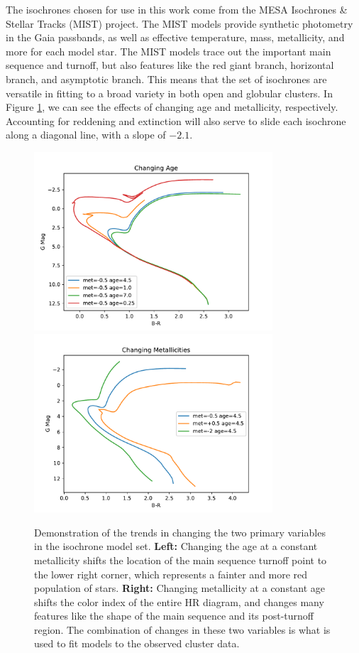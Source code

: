 \documentclass[onecolumn,table,xcdraw,super]{aastex631}
\begin{document}
The isochrones chosen for use in this work come from the MESA Isochrones \& Stellar Tracks (MIST) project. The MIST models provide synthetic photometry in the Gaia passbands, as well as effective temperature, mass, metallicity, and more for each model star. The MIST models trace out the important main sequence and turnoff, but also features like the red giant branch, horizontal branch, and asymptotic branch. This means that the set of isochrones are versatile in fitting to a broad variety in both open and globular clusters. In Figure \ref{fig:iso_trends}, we can see the effects of changing age and metallicity, respectively. Accounting for reddening and extinction will also serve to slide each isochrone along a diagonal line, with a slope of $-2.1$.

\begin{figure}[]
    \centering
      \includegraphics[width=3.5in]{figures/iso_age.pdf}
      \includegraphics[width=3.5in]{figures/iso_metallicity.pdf}
    \caption{Demonstration of the trends in changing the two primary variables in the isochrone model set. \textbf{Left:} Changing the age at a constant metallicity shifts the location of the main sequence turnoff point to the lower right corner, which represents a fainter and more red population of stars. \textbf{Right:} Changing metallicity at a constant age shifts the color index of the entire HR diagram, and changes many features like the shape of the main sequence and its post-turnoff region. The combination of changes in these two variables is what is used to fit models to the observed cluster data.}
    \label{fig:iso_trends}
\end{figure}
\end{document}
